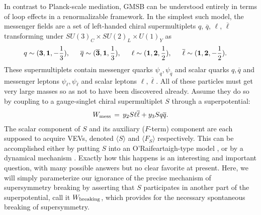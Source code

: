 \documentclass[12pt]{article}
\def\beq{\begin{eqnarray}}
\def\eeq{\end{eqnarray}}
\begin{document}
In contrast to Planck-scale mediation, GMSB can be understood entirely in 
terms of loop effects in a renormalizable framework. In the simplest 
such model, the messenger fields are a set of left-handed chiral 
supermultiplets $q$, $\overline q$, $\ell$, $\overline \ell$
transforming under $SU(3)_C\times SU(2)_L\times U(1)_Y$ as
\beq
q\sim({\bf 3},{\bf 1}, -{1\over 3}),\qquad\!\!\!
\overline q\sim({\bf \overline 3},{\bf 1}, {1\over 3}),\qquad\!\!\!
\ell \sim({\bf 1},{\bf 2}, {1\over 2}),\qquad\!\!\!
\overline \ell\sim({\bf 1},{\bf 2}, -{1\over 2}).\qquad\!\!\!{}
\label{minimalmess}
\eeq
These supermultiplets contain messenger quarks $\psi_q, \psi_{\overline
q}$ and scalar quarks $q, \overline q$ and messenger leptons $\psi_\ell,
\psi_{\overline \ell}$ and scalar leptons $\ell, \overline \ell$. All of
these particles must get very large masses so as not to have been
discovered already. Assume they do so by coupling to a gauge-singlet
chiral supermultiplet $S$ through a superpotential: 
\beq
W_{\rm mess} \, = \, y_2 S \ell \overline \ell + y_3 S q \overline q .
\eeq
The scalar component of $S$ and its auxiliary ($F$-term) component are 
each supposed to acquire VEVs, denoted $\langle S \rangle $ and $\langle 
F_S \rangle $ respectively. This can be accomplished either by putting $S$ 
into an O'Rai\-f\-ear\-taigh-type model \cite{oldgmsb}, or by a dynamical 
mechanism \cite{newgmsb}. Exactly how this happens is an interesting and 
important question, with many possible answers but no clear 
favorite at present.  Here, we will 
simply parameterize our ignorance of the precise mechanism of 
supersymmetry breaking by asserting that $S$ participates in another part 
of the superpotential, call it $W_{\rm breaking}$, which provides for the 
necessary spontaneous breaking of supersymmetry.
\end{document}
